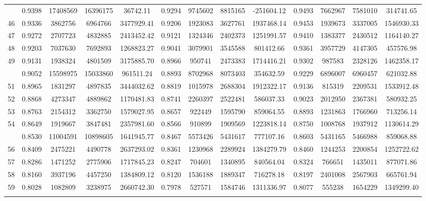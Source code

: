 \documentclass[
  12pt,
]{article}
\begin{document}
\begin{longtable}[t]{lcccccccccccc}
\addlinespace
45 & 0.9398 & 17408569 & 16396175 & 36742.11 & 0.9294 & 9745602 & 8815165 & -251604.12 & 0.9493 & 7662967 & 7581010 & 314741.65\\
46 & 0.9336 & 3862756 & 6964766 & 3477929.41 & 0.9206 & 1923083 & 3627761 & 1937468.14 & 0.9453 & 1939673 & 3337005 & 1546930.33\\
47 & 0.9272 & 2707723 & 4832885 & 2413452.42 & 0.9121 & 1324346 & 2402373 & 1251991.57 & 0.9410 & 1383377 & 2430512 & 1164140.27\\
48 & 0.9203 & 7037630 & 7692893 & 1268823.27 & 0.9041 & 3079901 & 3545588 & 801412.66 & 0.9361 & 3957729 & 4147305 & 457576.98\\
49 & 0.9131 & 1938324 & 4801509 & 3175885.70 & 0.8966 & 950741 & 2473383 & 1714416.21 & 0.9302 & 987583 & 2328126 & 1462358.17\\
\addlinespace
50 & 0.9052 & 15598975 & 15033860 & 961511.24 & 0.8893 & 8702968 & 8073403 & 354632.59 & 0.9229 & 6896007 & 6960457 & 621032.88\\
51 & 0.8965 & 1831297 & 4897835 & 3444032.62 & 0.8819 & 1015978 & 2688304 & 1912322.17 & 0.9136 & 815319 & 2209531 & 1533912.48\\
52 & 0.8868 & 4273347 & 4889862 & 1170481.83 & 0.8741 & 2260397 & 2522481 & 586037.33 & 0.9023 & 2012950 & 2367381 & 580932.25\\
53 & 0.8763 & 2154312 & 3362750 & 1579027.95 & 0.8657 & 922449 & 1595790 & 859064.55 & 0.8893 & 1231863 & 1766960 & 713256.14\\
54 & 0.8649 & 1919667 & 3847481 & 2357981.60 & 0.8566 & 910899 & 1909569 & 1223818.14 & 0.8750 & 1008768 & 1937912 & 1130614.29\\
\addlinespace
55 & 0.8530 & 11004591 & 10898605 & 1641945.77 & 0.8467 & 5573426 & 5431617 & 777107.16 & 0.8603 & 5431165 & 5466988 & 859068.88\\
56 & 0.8409 & 2475221 & 4490778 & 2637293.02 & 0.8361 & 1230968 & 2289924 & 1384279.79 & 0.8460 & 1244253 & 2200854 & 1252722.62\\
57 & 0.8286 & 1471252 & 2775906 & 1717845.23 & 0.8247 & 704601 & 1340895 & 840564.04 & 0.8324 & 766651 & 1435011 & 877071.86\\
58 & 0.8160 & 3937196 & 4457250 & 1384809.12 & 0.8120 & 1536188 & 1889347 & 716278.18 & 0.8197 & 2401008 & 2567903 & 665761.94\\
59 & 0.8028 & 1082809 & 3238975 & 2660742.30 & 0.7978 & 527571 & 1584746 & 1311336.97 & 0.8077 & 555238 & 1654229 & 1349299.40\\
\addlinespace

\end{longtable}
\end{document}
